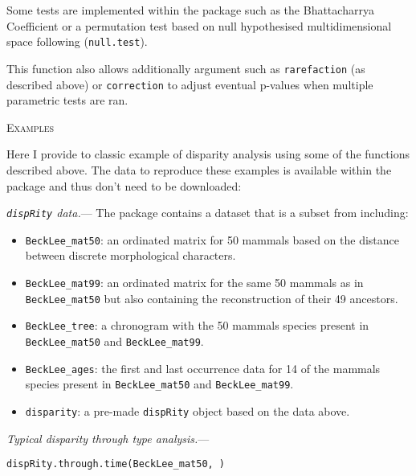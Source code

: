 \documentclass[12pt,letterpaper]{article}
\renewcommand{\section}[1]{%
\bigskip
\begin{center}
\begin{Large}
\normalfont\scshape #1
\medskip
\end{Large}
\end{center}}
\renewcommand{\subsubsection}[1]{%
\vspace{2ex}
\noindent
\textit{#1.}---}
\newcommand{\disp}{\texttt{dispRity} }
\begin{document}
Some tests are implemented within the package such as the Bhattacharrya Coefficient \citep[\texttt{bhatt.coeff}][]{Bhattacharyya,GuillermeCooper} or a permutation test based on null hypothesised multidimensional space following \cite{diaz2016global} (\texttt{null.test}).

This function also allows additionally argument such as \texttt{rarefaction} (as described above) or \texttt{correction} to adjust eventual p-values when multiple parametric tests are ran.

\section{Examples}
Here I provide to classic example of disparity analysis using some of the functions described above.
The data to reproduce these examples is available within the package and thus don't need to be downloaded:

\subsubsection{\disp data}
The package contains a dataset that is a subset from \cite{beckancient2014} including:

\begin{itemize}
    \item \texttt{BeckLee\_mat50}: an ordinated matrix for 50 mammals based on the distance between discrete morphological characters.
    \item \texttt{BeckLee\_mat99}: an ordinated matrix for the same 50 mammals as in \texttt{BeckLee\_mat50} but also containing the reconstruction of their 49 ancestors.
    \item \texttt{BeckLee\_tree}: a chronogram with the 50 mammals species present in \texttt{BeckLee\_mat50} and \texttt{BeckLee\_mat99}.
    \item \texttt{BeckLee\_ages}: the first and last occurrence data for 14 of the mammals species present in \texttt{BeckLee\_mat50} and \texttt{BeckLee\_mat99}.
    \item \texttt{disparity}: a pre-made \disp object based on the data above.
\end{itemize}

\subsubsection{Typical disparity through type analysis}


\texttt{dispRity.through.time(BeckLee\_mat50, )}
\end{document}
